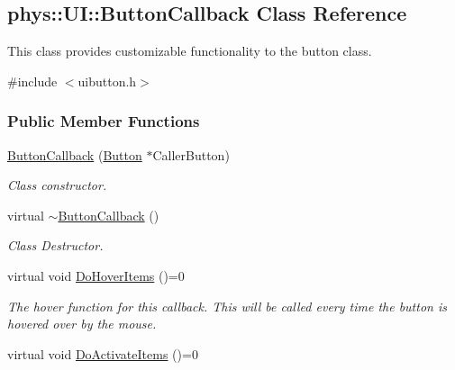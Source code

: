 \hypertarget{classphys_1_1UI_1_1ButtonCallback}{
\subsection{phys::UI::ButtonCallback Class Reference}
\label{df/dcb/classphys_1_1UI_1_1ButtonCallback}
}


This class provides customizable functionality to the button class.  




{\ttfamily \#include $<$uibutton.h$>$}

\subsubsection*{Public Member Functions}
\begin{DoxyCompactItemize}
\item 
\hyperlink{classphys_1_1UI_1_1ButtonCallback_a085db8789d4c712806e22c9040c69f39}{ButtonCallback} (\hyperlink{classphys_1_1UI_1_1Button}{Button} $\ast$CallerButton)
\begin{DoxyCompactList}\small\item\em Class constructor. \item\end{DoxyCompactList}\item 
\hypertarget{classphys_1_1UI_1_1ButtonCallback_a340fbc3fb86e9183285613f8af5b542e}{
virtual \hyperlink{classphys_1_1UI_1_1ButtonCallback_a340fbc3fb86e9183285613f8af5b542e}{$\sim$ButtonCallback} ()}
\label{df/dcb/classphys_1_1UI_1_1ButtonCallback_a340fbc3fb86e9183285613f8af5b542e}

\begin{DoxyCompactList}\small\item\em Class Destructor. \item\end{DoxyCompactList}\item 
\hypertarget{classphys_1_1UI_1_1ButtonCallback_a0374a47ec705a821ebf51162a7da9a54}{
virtual void \hyperlink{classphys_1_1UI_1_1ButtonCallback_a0374a47ec705a821ebf51162a7da9a54}{DoHoverItems} ()=0}
\label{df/dcb/classphys_1_1UI_1_1ButtonCallback_a0374a47ec705a821ebf51162a7da9a54}

\begin{DoxyCompactList}\small\item\em The hover function for this callback. This will be called every time the button is hovered over by the mouse. \item\end{DoxyCompactList}\item 
\hypertarget{classphys_1_1UI_1_1ButtonCallback_a47d5ff1399ac9f4ff586ea5e0c63249f}{
virtual void \hyperlink{classphys_1_1UI_1_1ButtonCallback_a47d5ff1399ac9f4ff586ea5e0c63249f}{DoActivateItems} ()=0}
\label{df/dcb/classphys_1_1UI_1_1ButtonCallback_a47d5ff1399ac9f4ff586ea5e0c63249f}


\end{DoxyCompactItemize}
